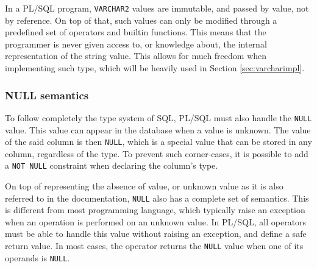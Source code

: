 \documentclass[twoside,11pt,a4paper]{article}
\newcommand{\maybe}[1]{\textit{(maybe ? #1)}}
\newcommand{\pls}[1]{\texttt{#1}}
\newcommand{\plstype}[1]{\pls{#1}}
\newcommand{\varchar}{\plstype{VARCHAR2}}
\newcommand{\plsnull}{\pls{NULL}}
\newcommand{\notnull}{\pls{NOT NULL}}
\begin{document}
In a PL/SQL program, \varchar{} values are immutable, and passed by value, not by reference. On top of that, such values can only be modified through a predefined set of operators and builtin functions. This means that the programmer is never given access to, or knowledge about, the internal representation of the string value. This allows for much freedom when implementing such type, which will be heavily used in Section \ref{sec:varcharimpl}.

\subsubsection{NULL semantics}

\label{sec:nullsemantics}


To follow completely the type system of SQL, PL/SQL must also handle the \plsnull{} value. This value can appear in the database when a value is unknown. The value of the said column is then \plsnull{}, which is a special value that can be stored in any column, regardless of the type. To prevent such corner-cases, it is possible to add a \notnull{} constraint when declaring the column's type.


On top of representing the absence of value, or unknown value as it is also referred to in the documentation, \plsnull{} also has a complete set of semantics. This is different from most programming language, which typically raise an exception when an operation is performed on an unknown value. In PL/SQL, all operators must be able to handle this value without raising an exception, and define a safe return value. In most cases, the operator returns the \plsnull{} value when one of its operands is \plsnull{}.
\end{document}
